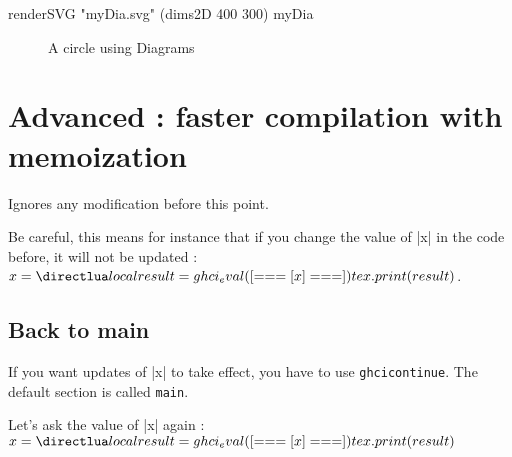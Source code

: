 \documentclass{article}
\begin{document}
\begin{ghci}
  renderSVG "myDia.svg" (dims2D 400 300) myDia
\end{ghci}

\begin{figure}[h]
  \centering
  
  \caption{A circle using Diagrams}
\end{figure}


\section{Advanced : faster compilation with memoization}

Ignores any modification before this point.

Be careful, this means for instance that if you change the value of |x| in the code before, it will not be updated : $x = \hask{x}$.


\subsection{Back to main}
If you  want updates of |x| to take effect, you have to use \texttt{ghcicontinue}. The default section is called \texttt{main}.

Let's ask the value of |x| again : $x = \hask{x}$
\end{document}
